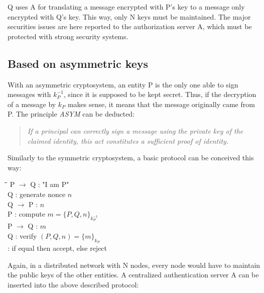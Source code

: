 Q uses A for translating a message encrypted with P's key to a message only encrypted with Q's key. This way, only N keys must be maintained. The major securities issues are here reported to the authorization server A, which must be protected with strong security systems.

\subsection{Based on asymmetric keys}
With an asymmetric cryptosystem, an entity P is the only one able to sign messages with $k_{P}^{-1}$, since it is supposed to be kept secret. Thus, if the decryption of a message by $k_{P}$ makes sense, it means that the message originally came from P. The principle \emph{ASYM} can be deducted\cite{Woo1997}:

\begin{quote}
	\textit{If a principal can correctly sign a message using the private key of the claimed identity, this act constitutes a sufficient proof of identity.}
\end{quote}

Similarly to the symmetric cryptosystem, a basic protocol can be conceived this way:

\begin{tabbing}
	\hspace{4em}\=\hspace{4em}\=\hspace{2em}\=\kill
	\>  P $\rightarrow$ Q\>  : \> "I am P" \\
	\>  Q  \>  : \> generate nonce $n$	\\
	\>  Q $\rightarrow$ P \>  : \> $n$ \\
	\>  P  \>  : \> compute $m = \lbrace P, Q, n \rbrace_{k_{P}^{-1}}$ 				\\
	\>  P $\rightarrow$ Q \>  : \> $m$ \\
	\>  Q \>  : \> verify $(P,Q,n) = \lbrace m \rbrace_{k_{P}}$ \\
	\>    \>  : \> if equal then accept, else reject \\
\end{tabbing} 

Again, in a distributed network with N nodes, every node would have to maintain the public keys of the other entities. A centralized authentication server A can be inserted into the above described protocol:

